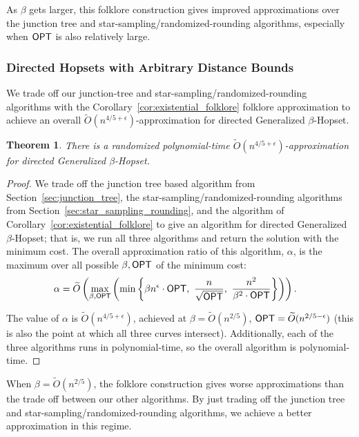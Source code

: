 \documentclass{article}
\newtheorem{theorem}{Theorem}[section]
\theoremstyle{definition}
\theoremstyle{remark}
\def\al    {\alpha}
\def\be    {\beta}
\def\opt {{\sf OPT}}
\def\hopset {{\sc Generalized $\beta$-Hopset}}
\begin{document}
As $\be$ gets larger, this folklore construction gives improved approximations over the junction tree and star-sampling/randomized-rounding algorithms, especially when $\opt$ is also relatively large. 


\subsubsection{Directed Hopsets with Arbitrary Distance Bounds}
We trade off our junction-tree and star-sampling/randomized-rounding algorithms with the Corollary~\ref{cor:existential_folklore} folklore approximation to achieve an overall $\widetilde{O}(n^{4/5 + \epsilon})$-approximation for directed {\hopset}. 

\begin{theorem} \label{thm:main_result}
    There is a randomized  polynomial-time $\widetilde{O}(n^{4/5 + \epsilon})$-approximation for directed {\hopset}.
\end{theorem}
\begin{proof}
    We trade off the junction tree based algorithm from Section~\ref{sec:junction_tree}, the star-sampling/randomized-rounding algorithms from Section~\ref{sec:star_sampling_rounding}, and the algorithm of Corollary~\ref{cor:existential_folklore} to give an algorithm for directed {\hopset}; that is, we run all three algorithms and return the solution with the minimum cost. The overall approximation ratio of this algorithm, $\al$, is the maximum over all possible $\beta, \opt$ of the minimum cost:
    \begin{align*}
        \al &= \widetilde{O}\left( \max_{\be, {\opt}} \left( \min_{} \left\{ \be n^\epsilon \cdot {\opt}, \mbox{ } \frac{n}{\sqrt{{\opt}}}, \mbox{ }\frac{n^2}{\be^2 \cdot {\opt}}  \right\} \right) \right).                    
    \end{align*}
    
    The value of $\al$ is $\widetilde{O}(n^{4/5+\epsilon})$, achieved at $\be = \widetilde{O}(n^{2/5})$, ${\opt} = \widetilde{O}(n^{2/5 - \epsilon})$ (this is also the point at which all three curves intersect). Additionally, each of the three algorithms runs in polynomial-time, so the overall algorithm is polynomial-time.
\end{proof}


When $\beta = \widetilde{O}(n^{2/5})$, the folklore construction gives worse approximations than the trade off between our other algorithms. By just trading off the junction tree and star-sampling/randomized-rounding algorithms, we achieve a better approximation in this regime.
\end{document}
